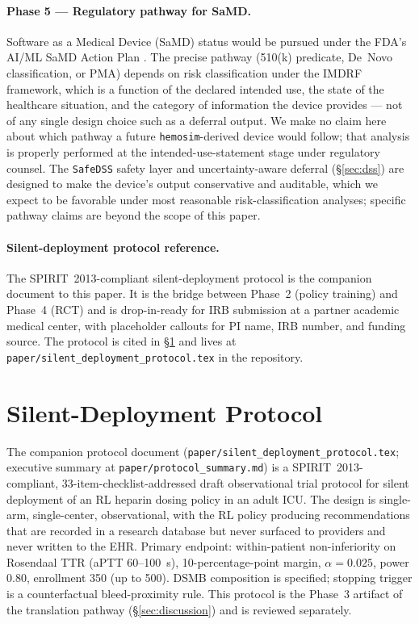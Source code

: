 \documentclass[11pt]{article}
\begin{document}
\paragraph{Phase 5 --- Regulatory pathway for SaMD.}
Software as a Medical Device (SaMD) status would be pursued under the FDA's AI/ML SaMD Action Plan \citep{samdfda2021}. The precise pathway (510(k) predicate, De~Novo classification, or PMA) depends on risk classification under the IMDRF framework, which is a function of the declared intended use, the state of the healthcare situation, and the category of information the device provides --- not of any single design choice such as a deferral output. We make no claim here about which pathway a future \texttt{hemosim}-derived device would follow; that analysis is properly performed at the intended-use-statement stage under regulatory counsel. The \texttt{SafeDSS} safety layer and uncertainty-aware deferral (\S\ref{sec:dss}) are designed to make the device's output conservative and auditable, which we expect to be favorable under most reasonable risk-classification analyses; specific pathway claims are beyond the scope of this paper.

\paragraph{Silent-deployment protocol reference.}
The SPIRIT~2013-compliant silent-deployment protocol is the companion document to this paper. It is the bridge between Phase~2 (policy training) and Phase~4 (RCT) and is drop-in-ready for IRB submission at a partner academic medical center, with placeholder callouts for PI name, IRB number, and funding source. The protocol is cited in \S\ref{sec:protocol} and lives at \texttt{paper/silent\_deployment\_protocol.tex} in the repository.

\section{Silent-Deployment Protocol}
\label{sec:protocol}

The companion protocol document (\texttt{paper/silent\_deployment\_protocol.tex}; executive summary at \texttt{paper/protocol\_summary.md}) is a SPIRIT~2013-compliant, 33-item-checklist-addressed draft observational trial protocol for silent deployment of an RL heparin dosing policy in an adult ICU. The design is single-arm, single-center, observational, with the RL policy producing recommendations that are recorded in a research database but never surfaced to providers and never written to the EHR. Primary endpoint: within-patient non-inferiority on Rosendaal TTR (aPTT 60--100~s), 10-percentage-point margin, $\alpha = 0.025$, power 0.80, enrollment 350 (up to 500). DSMB composition is specified; stopping trigger is a counterfactual bleed-proximity rule. This protocol is the Phase~3 artifact of the translation pathway (\S\ref{sec:discussion}) and is reviewed separately.
\end{document}
